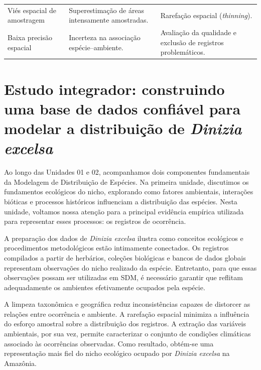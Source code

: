 \begin{table}[H]
\begin{tabular}{p{4cm}p{5cm}p{5cm}}
		\\
		
		Viés espacial de amostragem
		&
		Superestimação de áreas intensamente amostradas.
		&
		Rarefação espacial (\textit{thinning}).
		
		\\
		
		Baixa precisão espacial
		&
		Incerteza na associação espécie--ambiente.
		&
		Avaliação da qualidade e exclusão de registros problemáticos.
		
		\\
		
		\bottomrule
	\end{tabular}
\end{table}

\section{Estudo integrador: construindo uma base de dados confiável para modelar a distribuição de \textit{Dinizia excelsa}}

Ao longo das Unidades 01 e 02, acompanhamos dois componentes fundamentais da Modelagem de Distribuição de Espécies. Na primeira unidade, discutimos os fundamentos ecológicos do nicho, explorando como fatores ambientais, interações bióticas e processos históricos influenciam a distribuição das espécies. Nesta unidade, voltamos nossa atenção para a principal evidência empírica utilizada para representar esses processos: os registros de ocorrência.

A preparação dos dados de \textit{Dinizia excelsa} ilustra como conceitos ecológicos e procedimentos metodológicos estão intimamente conectados. Os registros compilados a partir de herbários, coleções biológicas e bancos de dados globais representam observações do nicho realizado da espécie. Entretanto, para que essas observações possam ser utilizadas em SDM, é necessário garantir que reflitam adequadamente os ambientes efetivamente ocupados pela espécie.

A limpeza taxonômica e geográfica reduz inconsistências capazes de distorcer as relações entre ocorrência e ambiente. A rarefação espacial minimiza a influência do esforço amostral sobre a distribuição dos registros. A extração das variáveis ambientais, por sua vez, permite caracterizar o conjunto de condições climáticas associado às ocorrências observadas. Como resultado, obtém-se uma representação mais fiel do nicho ecológico ocupado por \textit{Dinizia excelsa} na Amazônia.

